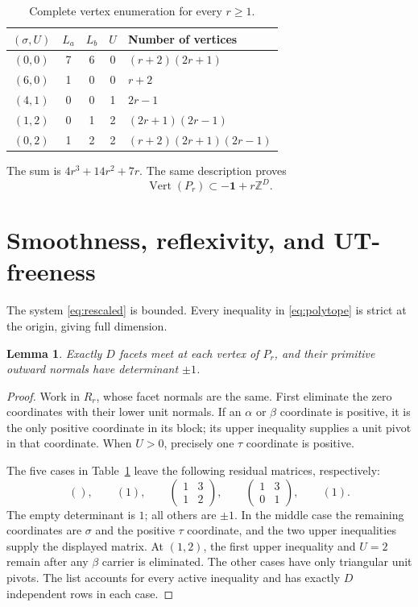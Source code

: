 \documentclass[11pt]{article}
\newtheorem{lemma}[theorem]{Lemma}
\theoremstyle{remark}\newtheorem{remark}[theorem]{Remark}
\newcommand{\Z}{\mathbb Z}
\newcommand{\one}{\mathbf1}
\DeclareMathOperator{\Verts}{Vert}
\begin{document}
\begin{table}[ht]
\centering\renewcommand{\arraystretch}{1.15}
\begin{tabular}{@{}cccc l@{}}
\toprule
\((\sigma,U)\)&\(L_a\)&\(L_b\)&\(U\)&Number of vertices\\
\midrule
\((0,0)\)&7&6&0&\((r+2)(2r+1)\)\\
\((6,0)\)&1&0&0&\(r+2\)\\
\((4,1)\)&0&0&1&\(2r-1\)\\
\((1,2)\)&0&1&2&\((2r+1)(2r-1)\)\\
\((0,2)\)&1&2&2&\((r+2)(2r+1)(2r-1)\)\\
\bottomrule
\end{tabular}
\caption{Complete vertex enumeration for every \(r\ge1\).}
\label{tab:vertices}
\end{table}

The sum is \(4r^3+14r^2+7r\).
The same description proves
\begin{equation}\label{eq:coset}
                    \Verts(P_r)\subset-\one+r\Z^D.
\end{equation}

\section{Smoothness, reflexivity, and UT-freeness}

The system \eqref{eq:rescaled} is bounded.
Every inequality in \eqref{eq:polytope} is strict at the origin, giving
full dimension.

\begin{lemma}\label{lem:smooth}
Exactly \(D\) facets meet at each vertex of \(P_r\), and their primitive
outward normals have determinant \(\pm1\).
\end{lemma}
\begin{proof}
Work in \(R_r\), whose facet normals are the same.
First eliminate the zero coordinates with their lower unit normals.
If an \(\alpha\) or \(\beta\) coordinate is positive, it is the only
positive coordinate in its block; its upper inequality supplies
a unit pivot in that coordinate.
When \(U>0\), precisely one \(\tau\) coordinate is positive.

The five cases in Table~\ref{tab:vertices} leave the following residual
matrices, respectively:
\[
 (),\qquad (1),\qquad
 \begin{pmatrix}1&3\\1&2\end{pmatrix},\qquad
 \begin{pmatrix}1&3\\0&1\end{pmatrix},\qquad (1).
\]
The empty determinant is \(1\); all others are \(\pm1\).
In the middle case the remaining coordinates are \(\sigma\) and the
positive \(\tau\) coordinate, and the two upper inequalities supply
the displayed matrix.
At \((1,2)\), the first upper inequality and \(U=2\) remain after
any \(\beta\) carrier is eliminated.
The other cases have only triangular unit pivots.
The list accounts for every active inequality and has exactly \(D\)
independent rows in each case.
\end{proof}
\end{document}
